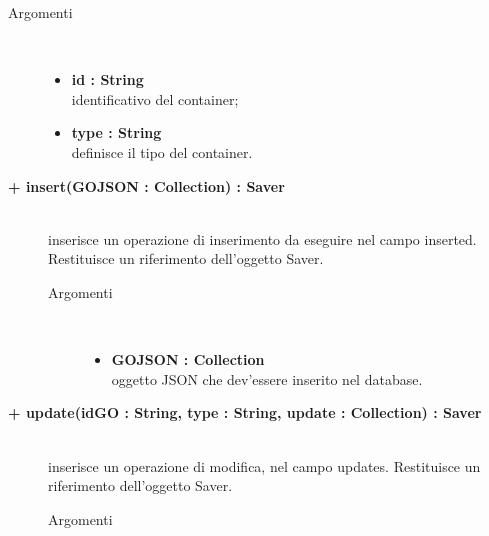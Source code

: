 \begin{description}
\begin{description}
		\begin{description}
			\item[Argomenti] \hfill \\
				\begin{itemize}
				
					\item \textbf{id : String			} \hfill \\
					identificativo del container;
					\item \textbf{type : String			} \hfill \\
					definisce il tipo del container.
				\end{itemize}
		\end{description}
	\end{description}	

	\begin{description}
		\item[\textbf{\color{blue}+ insert(GOJSON : Collection) : Saver			}] \hfill \\
			inserisce un operazione di inserimento da eseguire nel campo inserted. Restituisce un riferimento dell'oggetto Saver.
			
		\begin{description}
			\item[Argomenti] \hfill \\
				\begin{itemize}
				
					\item \textbf{GOJSON : Collection			} \hfill \\
					oggetto JSON che dev'essere inserito nel database.
				\end{itemize}
		\end{description}
	\end{description}	

	\begin{description}
		\item[\textbf{\color{blue}+ update(idGO : String, type : String, update : Collection) : Saver			}] \hfill \\
			inserisce un operazione di modifica, nel campo updates. Restituisce un riferimento dell'oggetto Saver.
			
		\begin{description}
			\item[Argomenti] \hfill \\
				\begin{itemize}
				

\end{itemize}
\end{description}
\end{description}
\end{description}
